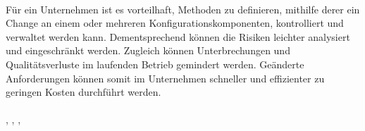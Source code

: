 \\
Für ein Unternehmen ist es vorteilhaft, Methoden zu definieren, mithilfe derer ein Change an einem oder mehreren Konfigurationskomponenten, kontrolliert und verwaltet werden kann. Dementsprechend können die Risiken leichter analysiert und eingeschränkt werden. Zugleich können Unterbrechungen und Qualitätsverluste im laufenden Betrieb gemindert werden. Geänderte Anforderungen können somit im Unternehmen schneller und effizienter zu geringen Kosten durchführt werden. 
\\\\
\cite{cm-oldenburg}, \cite{cm-stolpersteine}, \cite{cm-itil} \cite{cm-bestpractices}, \cite{cm-munich}
